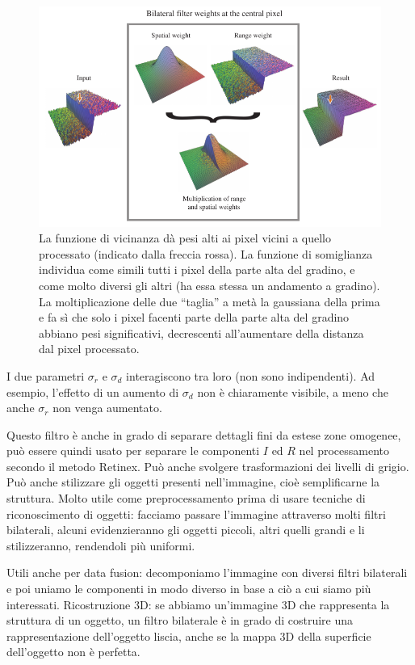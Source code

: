 \documentclass[a4paper,11pt]{article}
\begin{document}
\renewcommand{\thefigure}{8.3}
\begin{figure}[!h]
  \centering
    \includegraphics[scale=0.5]{images/8/bilateral_example.png}
    \caption{La funzione di vicinanza dà pesi alti ai pixel vicini a quello processato (indicato dalla freccia rossa). La funzione di somiglianza individua
    come simili tutti i pixel della parte alta del gradino, e come molto diversi gli altri (ha essa stessa un andamento a gradino). La moltiplicazione delle due
    ``taglia'' a metà la gaussiana della prima e fa sì che solo i pixel facenti parte della parte alta del gradino abbiano pesi significativi, decrescenti all'aumentare
    della distanza dal pixel processato.}
\end{figure}

I due parametri $\sigma_r$ e $\sigma_d$ interagiscono tra loro (non sono indipendenti). Ad esempio, l'effetto di un aumento di $\sigma_d$ non è
chiaramente visibile, a meno che anche $\sigma_r$ non venga aumentato.
\par
Questo filtro è anche in grado di separare dettagli fini da estese zone omogenee, può essere quindi usato per separare le componenti
$I$ ed $R$ nel processamento secondo il metodo Retinex. Può anche svolgere trasformazioni dei livelli di grigio.
Può anche stilizzare gli oggetti presenti nell'immagine, cioè semplificarne la struttura. Molto utile come preprocessamento prima di usare tecniche
di riconoscimento di oggetti: facciamo passare l'immagine attraverso molti filtri bilaterali, alcuni evidenzieranno gli oggetti piccoli, altri
quelli grandi e li stilizzeranno, rendendoli più uniformi.
\par
Utili anche per data fusion: decomponiamo l'immagine con diversi filtri bilaterali e poi uniamo le componenti in modo diverso in base
a ciò a cui siamo più interessati.
Ricostruzione 3D: se abbiamo un'immagine 3D che rappresenta la struttura di un oggetto, un filtro bilaterale
è in grado di costruire una rappresentazione dell'oggetto liscia, anche se la mappa 3D della superficie dell'oggetto non è perfetta.
\end{document}

